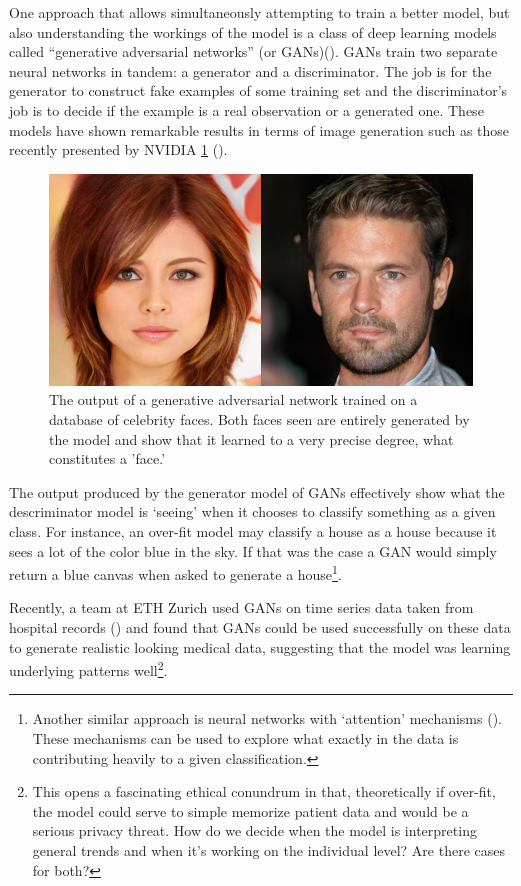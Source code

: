 \documentclass[]{book}
\let\rmarkdownfootnote\footnote%
\def\footnote{\protect\rmarkdownfootnote}
\theoremstyle{definition}
\theoremstyle{definition}
\theoremstyle{definition}
\theoremstyle{remark}
\begin{document}
One approach that allows simultaneously attempting to train a better
model, but also understanding the workings of the model is a class of
deep learning models called ``generative adversarial networks'' (or
GANs)(\citet{gans}). GANs train two separate neural networks in tandem:
a generator and a discriminator. The job is for the generator to
construct fake examples of some training set and the discriminator's job
is to decide if the example is a real observation or a generated one.
These models have shown remarkable results in terms of image generation
such as those recently presented by NVIDIA \ref{fig:ganexample}
(\citet{progressive_gans}).

\begin{figure}

{\centering \includegraphics[width=0.8\linewidth]{figures/gan_example} 

}

\caption{The output of a generative adversarial network trained on a database of celebrity faces. Both faces seen are entirely generated by the model and show that it learned to a very precise degree, what constitutes a 'face.'}\label{fig:ganexample}
\end{figure}

The output produced by the generator model of GANs effectively show what
the descriminator model is `seeing' when it chooses to classify
something as a given class. For instance, an over-fit model may classify
a house as a house because it sees a lot of the color blue in the sky.
If that was the case a GAN would simply return a blue canvas when asked
to generate a house\footnote{Another similar approach is neural networks
  with `attention' mechanisms (\citet{attention}). These mechanisms can
  be used to explore what exactly in the data is contributing heavily to
  a given classification.}.

Recently, a team at ETH Zurich used GANs on time series data taken from
hospital records (\citet{medical_gans}) and found that GANs could be
used successfully on these data to generate realistic looking medical
data, suggesting that the model was learning underlying patterns
well\footnote{This opens a fascinating ethical conundrum in that,
  theoretically if over-fit, the model could serve to simple memorize
  patient data and would be a serious privacy threat. How do we decide
  when the model is interpreting general trends and when it's working on
  the individual level? Are there cases for both?}.
\end{document}
